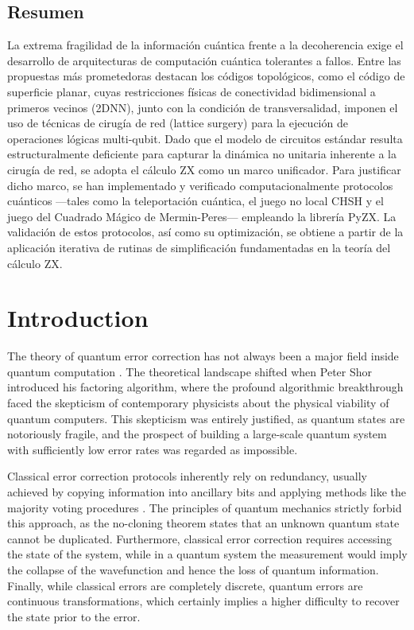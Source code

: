 \documentclass[12pt, twoside, openany]{book}
\begin{document}
\section*{Resumen}
   La extrema fragilidad de la información cuántica frente a la decoherencia exige el desarrollo de arquitecturas de computación cuántica tolerantes a fallos. Entre las propuestas más prometedoras destacan los códigos topológicos, como el código de superficie planar, cuyas restricciones físicas de conectividad bidimensional a primeros vecinos (2DNN), junto con la condición de transversalidad, imponen el uso de técnicas de cirugía de red (lattice surgery) para la ejecución de operaciones lógicas multi-qubit. Dado que el modelo de circuitos estándar resulta estructuralmente deficiente para capturar la dinámica no unitaria inherente a la cirugía de red, se adopta el cálculo ZX como un marco unificador. Para justificar dicho marco, se han implementado y verificado computacionalmente protocolos cuánticos —tales como la teleportación cuántica, el juego no local CHSH y el juego del Cuadrado Mágico de Mermin-Peres— empleando la librería PyZX. La validación de estos protocolos, así como su optimización, se obtiene a partir de la aplicación iterativa de rutinas de simplificación fundamentadas en la teoría del cálculo ZX.

\chapter{Introduction}

The theory of quantum error correction has not always been a major field inside quantum computation \cite{Kastoryano2018}. The theoretical landscape shifted when Peter Shor introduced his factoring algorithm, where the profound algorithmic breakthrough faced the skepticism of contemporary physicists about the physical viability of quantum computers. This skepticism was entirely justified, as quantum states are notoriously fragile, and the prospect of building a large-scale quantum system with sufficiently low error rates was regarded as impossible.

Classical error correction protocols inherently rely on redundancy, usually achieved by copying information into ancillary bits and applying methods like the majority voting procedures \cite{Girvin2023}. The principles of quantum mechanics strictly forbid this approach, as the no-cloning theorem states that an unknown quantum state cannot be duplicated. Furthermore, classical error correction requires accessing the state of the system, while in a quantum system the measurement would imply the collapse of the wavefunction and hence the loss of quantum information. Finally, while classical errors are completely discrete, quantum errors are continuous transformations, which certainly implies a higher difficulty to recover the state prior to the error.
\end{document}
